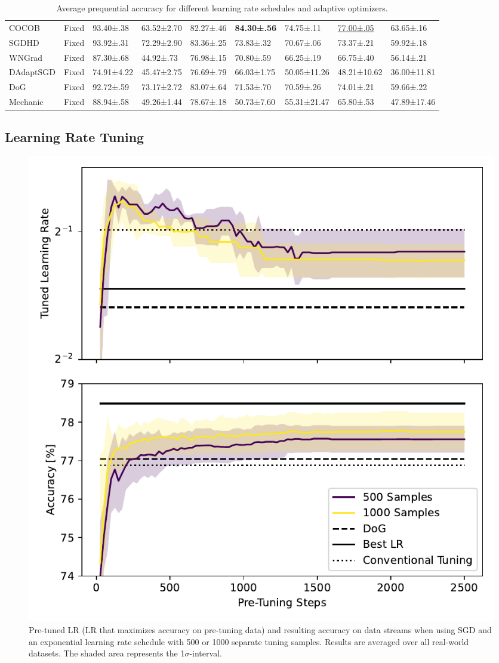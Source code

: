 \documentclass[letterpaper]{article} %
\begin{document}
\begin{table}
\begin{tabular}{lllllllll}
		COCOB                    & Fixed      & 93.40±.38              & 63.52±2.70          & 82.27±.46           & \bfseries 84.30±.56 & 74.75±.11           & \underline{77.00±.05} & 63.65±.16             \\
		SGDHD                    & Fixed      & 93.92±.31              & 72.29±2.90          & 83.36±.25           & 73.83±.32           & 70.67±.06           & 73.37±.21             & 59.92±.18             \\
		WNGrad                   & Fixed      & 87.30±.68              & 44.92±.73           & 76.98±.15           & 70.80±.59           & 66.25±.19           & 66.75±.40             & 56.14±.21             \\
		DAdaptSGD                & Fixed      & 74.91±4.22             & 45.47±2.75          & 76.69±.79           & 66.03±1.75          & 50.05±11.26         & 48.21±10.62           & 36.00±11.81           \\
		DoG                      & Fixed      & 92.72±.59              & 73.17±2.72          & 83.07±.64           & 71.53±.70           & 70.59±.26           & 74.01±.21             & 59.66±.22             \\
		Mechanic                 & Fixed      & 88.94±.58              & 49.26±1.44          & 78.67±.18           & 50.73±7.60          & 55.31±21.47         & 65.80±.53             & 47.89±17.46           \\
		\bottomrule
	\end{tabular}
	\caption{Average prequential accuracy for different learning rate schedules and adaptive optimizers.}
	\label{tab:all_results}
\end{table}

\subsection{Learning Rate Tuning}

\begin{figure}[ht]
	\centering
	\includegraphics[width=.45\textwidth]{figures/pretune_1x64_acc_lr_exp_schedule.pdf}
	\caption{Pre-tuned LR (LR that maximizes accuracy on pre-tuning data) and resulting accuracy on data streams when using SGD and an exponential learning rate schedule with 500 or 1000 separate tuning samples. Results are averaged over all real-world datasets. The shaded area represents the 1$\sigma$-interval.}\label{fig:pretune_lr_accuracy}
\end{figure}
\end{document}
